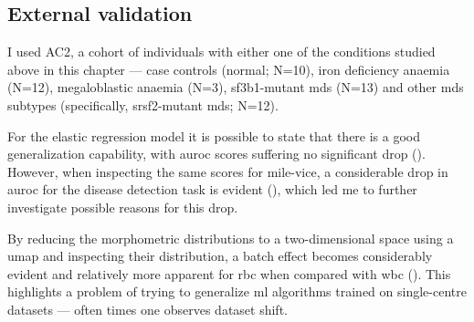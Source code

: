 \subsection{External validation}

I used AC2, a cohort of individuals with either one of the conditions studied above in this chapter --- case controls (normal; N=10), iron deficiency anaemia (N=12), megaloblastic anaemia (N=3), \ac{sf3b1}-mutant \ac{mds} (N=13) and other \ac{mds} subtypes (specifically, \ac{srsf2}-mutant \ac{mds}; N=12). 

For the elastic regression model it is possible to state that there is a good generalization capability, with \ac{auroc} scores suffering no significant drop (). However, when inspecting the same scores for \ac{mile-vice}, a considerable drop in \ac{auroc} for the disease detection task is evident (), which led me to further investigate possible reasons for this drop.

\begin{figure}[!ht]
    \label{fig:glmnet-auc-validation}
\end{figure}

\begin{figure}[!ht]
    \label{fig:mile-vice-auc-validation}
\end{figure}

By reducing the morphometric distributions to a two-dimensional space using a \ac{umap} and inspecting their distribution, a batch effect becomes considerably evident and relatively more apparent for \ac{rbc} when compared with \ac{wbc} (). This highlights a problem of trying to generalize \ac{ml} algorithms trained on single-centre datasets --- often times one observes dataset shift. 

\begin{figure}[!ht]
    \label{fig:u-map}
\end{figure}

